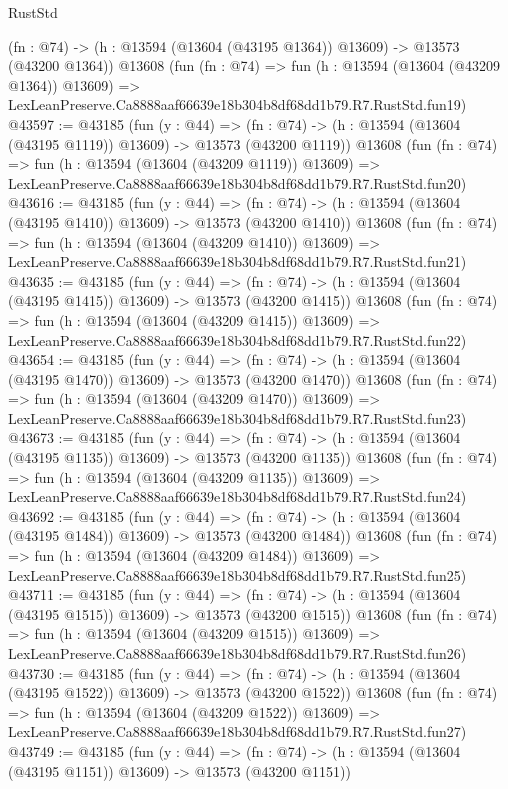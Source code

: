 \begin{lexlean}{RustStd}
\begin{coremodule}
    (fn : @74) -> (h : @13594 (@13604 (@43195 @1364)) @13609) -> @13573 (@43200 @1364))
    @13608
    (fun (fn : @74) =>
    fun (h : @13594 (@13604 (@43209 @1364)) @13609) =>
    LexLeanPreserve.Ca8888aaf66639e18b304b8df68dd1b79.R7.RustStd.fun19)
@43597 := @43185
    (fun (y : @44) =>
    (fn : @74) -> (h : @13594 (@13604 (@43195 @1119)) @13609) -> @13573 (@43200 @1119))
    @13608
    (fun (fn : @74) =>
    fun (h : @13594 (@13604 (@43209 @1119)) @13609) =>
    LexLeanPreserve.Ca8888aaf66639e18b304b8df68dd1b79.R7.RustStd.fun20)
@43616 := @43185
    (fun (y : @44) =>
    (fn : @74) -> (h : @13594 (@13604 (@43195 @1410)) @13609) -> @13573 (@43200 @1410))
    @13608
    (fun (fn : @74) =>
    fun (h : @13594 (@13604 (@43209 @1410)) @13609) =>
    LexLeanPreserve.Ca8888aaf66639e18b304b8df68dd1b79.R7.RustStd.fun21)
@43635 := @43185
    (fun (y : @44) =>
    (fn : @74) -> (h : @13594 (@13604 (@43195 @1415)) @13609) -> @13573 (@43200 @1415))
    @13608
    (fun (fn : @74) =>
    fun (h : @13594 (@13604 (@43209 @1415)) @13609) =>
    LexLeanPreserve.Ca8888aaf66639e18b304b8df68dd1b79.R7.RustStd.fun22)
@43654 := @43185
    (fun (y : @44) =>
    (fn : @74) -> (h : @13594 (@13604 (@43195 @1470)) @13609) -> @13573 (@43200 @1470))
    @13608
    (fun (fn : @74) =>
    fun (h : @13594 (@13604 (@43209 @1470)) @13609) =>
    LexLeanPreserve.Ca8888aaf66639e18b304b8df68dd1b79.R7.RustStd.fun23)
@43673 := @43185
    (fun (y : @44) =>
    (fn : @74) -> (h : @13594 (@13604 (@43195 @1135)) @13609) -> @13573 (@43200 @1135))
    @13608
    (fun (fn : @74) =>
    fun (h : @13594 (@13604 (@43209 @1135)) @13609) =>
    LexLeanPreserve.Ca8888aaf66639e18b304b8df68dd1b79.R7.RustStd.fun24)
@43692 := @43185
    (fun (y : @44) =>
    (fn : @74) -> (h : @13594 (@13604 (@43195 @1484)) @13609) -> @13573 (@43200 @1484))
    @13608
    (fun (fn : @74) =>
    fun (h : @13594 (@13604 (@43209 @1484)) @13609) =>
    LexLeanPreserve.Ca8888aaf66639e18b304b8df68dd1b79.R7.RustStd.fun25)
@43711 := @43185
    (fun (y : @44) =>
    (fn : @74) -> (h : @13594 (@13604 (@43195 @1515)) @13609) -> @13573 (@43200 @1515))
    @13608
    (fun (fn : @74) =>
    fun (h : @13594 (@13604 (@43209 @1515)) @13609) =>
    LexLeanPreserve.Ca8888aaf66639e18b304b8df68dd1b79.R7.RustStd.fun26)
@43730 := @43185
    (fun (y : @44) =>
    (fn : @74) -> (h : @13594 (@13604 (@43195 @1522)) @13609) -> @13573 (@43200 @1522))
    @13608
    (fun (fn : @74) =>
    fun (h : @13594 (@13604 (@43209 @1522)) @13609) =>
    LexLeanPreserve.Ca8888aaf66639e18b304b8df68dd1b79.R7.RustStd.fun27)
@43749 := @43185
    (fun (y : @44) =>
    (fn : @74) -> (h : @13594 (@13604 (@43195 @1151)) @13609) -> @13573 (@43200 @1151))

\end{coremodule}
\end{lexlean}
